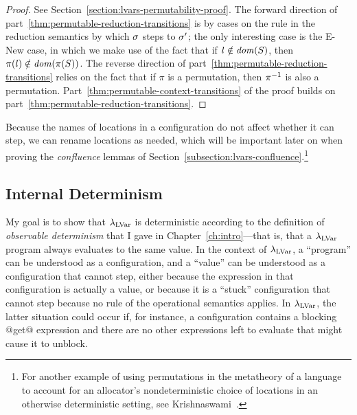 \LVarsLemPermutability
\begin{proof}
  See Section~\ref{section:lvars-permutability-proof}.  The forward
  direction of part~\ref{thm:permutable-reduction-transitions} is by
  cases on the rule in the reduction semantics by which $\sigma$ steps
  to $\sigma'$; the only interesting case is the {\sc E-New} case, in
  which we make use of the fact that if $l \notin \mathit{dom}(S)$, then
  $\pi(l) \notin \mathit{dom}(\pi(S))$. The reverse direction of
  part~\ref{thm:permutable-reduction-transitions} relies on the fact
  that if $\pi$ is a permutation, then $\pi^{-1}$ is also a permutation.
  Part~\ref{thm:permutable-context-transitions} of the proof builds on
  part~\ref{thm:permutable-reduction-transitions}.
\end{proof}

Because the names of locations in a configuration do not affect
whether it can step, we can rename locations as needed, which will be
important later on when proving the \emph{confluence} lemmas of
Section~\ref{subsection:lvars-confluence}.\footnote{For another
  example of using permutations in the metatheory of a language to
  account for an allocator's nondeterministic choice of locations in
  an otherwise deterministic setting, see
  Krishnaswami~\cite{simple-frp}.}

\subsection{Internal Determinism}

My goal is to show that $\lambda_{\textrm{LVar}}$ is deterministic according to
the definition of \emph{observable determinism} that I gave in
Chapter~\ref{ch:intro}---that is, that a $\lambda_{\textrm{LVar}}$ program always
evaluates to the same value.  In the context of $\lambda_{\textrm{LVar}}$, a
``program'' can be understood as a configuration, and a ``value'' can
be understood as a configuration that cannot step, either because the
expression in that configuration is actually a value, or because it is
a ``stuck'' configuration that cannot step because no rule of the
operational semantics applies.  In $\lambda_{\textrm{LVar}}$, the latter situation
could occur if, for instance, a configuration contains a blocking
@get@ expression and there are no other expressions left to evaluate
that might cause it to unblock.

